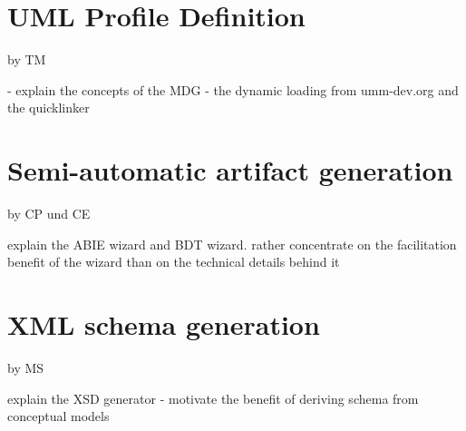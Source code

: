\documentclass{acm_proc_article-sp}
\begin{document}
\section{UML Profile Definition} by TM

- explain the concepts of the MDG - the dynamic loading from umm-dev.org and the quicklinker

\section{Semi-automatic artifact generation} by CP und CE

explain the ABIE wizard and BDT wizard. rather concentrate on the facilitation benefit of the wizard than on the technical details behind it

\section{XML schema generation} by MS

explain the XSD generator - motivate the benefit of deriving schema from conceptual models




\nocite{man:umm2} 
\nocite{man:upcc} 
\nocite{man:VIENNAAddIn}






  
\end{document}
